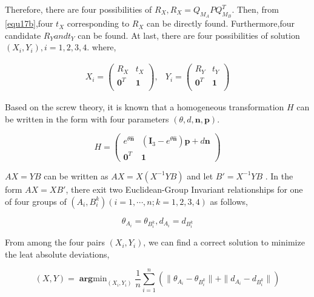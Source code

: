 \documentclass[conference,letterpaper]{IEEEtran}
\begin{document}
Therefore, there are four possibilities of $R_{X}, R_{X}=Q_{M_{A}}PQ_{M_{B}}^T$. Then, from \ref{equ17b},four $t_{X}$ corresponding to $R_{X}$ can be directly found. Furthermore,four candidate $R_{Y} and t_{Y}$ can be found. At last, there are four possibilities of solution $(X_{i},Y_{i}), i = 1,2,3,4$.
where,

\begin{equation}\label{equ20}
\begin{array}{cc}
X_{i}= \left( \begin{array}{cc}
       R_{X} & t_{X} \\
       \mathbf{0}^{T} & \mathbf{1}\\
\end{array} \right),&
Y_{i}= \left( \begin{array}{cc}
       R_{Y} & t_{Y} \\
       \mathbf{0}^{T} & \mathbf{1}\\
\end{array} \right)
\end{array}
\end{equation}

Based on the screw theory, it is known that a homogeneous transformation $H$ can be written in the form with four parameters $(\theta,d,\mathbf{n},\mathbf{p})$.

\begin{equation}\label{equ21}
H = \left( \begin{array}{cc}
       e^{\theta \hat{\mathbf{n}}} & (\mathbf{I}_{3} - e^{\theta \hat{\mathbf{n}}})\mathbf{p} + d\mathbf{n} \\
       \mathbf{0}^{T} & \mathbf{1}
\end{array} \right)
\end{equation}

$AX=YB$ can be written as $AX=X(X^{-1}YB)$ and let $B' = X^{-1}YB$ . In the form $AX=XB'$, there exit two Euclidean-Group Invariant relationships for one of four groups of $(A_{i},B_{i}^k)( i = 1,\cdots,n; k=1,2,3,4)$ as follows,

\begin{equation}\label{equ22}
    \theta_{A_{i}}=\theta_{B_{i}^{k}}, d_{A_{i}}=d_{B_{i}^{k}}
\end{equation}

From among the four pairs $(X_{i},Y_{i})$, we can find a correct solution to minimize the leat absolute deviations,

\begin{equation}\label{equ23}
    (X,Y) = \mathop{\mathbf{arg}min}_{(X_{i},Y_{i})}\frac{1}{n} \sum_{i=1}^{n} (\parallel \theta_{A_{i}}-\theta_{B_{i}^{k}} \parallel + \parallel d_{A_{i}}-d_{B_{i}^{k}} \parallel)
\end{equation}
\end{document}
